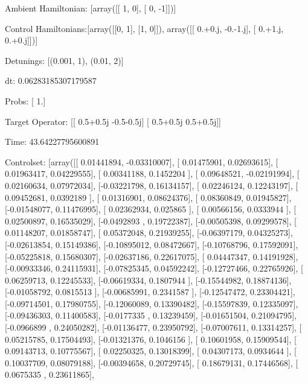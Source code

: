 \documentclass{article}
\begin{document}
    

\newpage

Ambient Hamiltonian: [array([[ 1,  0],
       [ 0, -1]])]

Control Hamiltonians:[array([[0, 1],
       [1, 0]]), array([[ 0.+0.j, -0.-1.j],
       [ 0.+1.j,  0.+0.j]])]

Detunings: [(0.001, 1), (0.01, 2)]

 dt: 0.06283185307179587

Probs: [ 1.]

Target Operator: [[ 0.5+0.5j -0.5-0.5j]
 [ 0.5+0.5j  0.5+0.5j]]

Time: 43.64227795600891

Controlset: [array([[ 0.01441894, -0.03310007],
       [ 0.01475901,  0.02693615],
       [ 0.01963417,  0.04229555],
       [ 0.00341188,  0.1452204 ],
       [ 0.09648521, -0.02191994],
       [ 0.02160634,  0.07972034],
       [-0.03221798,  0.16134157],
       [ 0.02246124,  0.12243197],
       [ 0.09452681,  0.0392189 ],
       [ 0.01316901,  0.08624376],
       [ 0.08360849,  0.01945827],
       [-0.01548077,  0.11476995],
       [ 0.02362934,  0.025865  ],
       [ 0.00566156,  0.0333944 ],
       [ 0.02500897,  0.16535029],
       [-0.0492893 ,  0.19722387],
       [-0.00505398,  0.09299578],
       [ 0.01148207,  0.01858747],
       [ 0.05372048,  0.21939255],
       [-0.06397179,  0.04325273],
       [-0.02613854,  0.15149386],
       [-0.10895012,  0.08472667],
       [-0.10768796,  0.17592091],
       [-0.05225818,  0.15680307],
       [-0.02637186,  0.22617075],
       [ 0.04447347,  0.14191928],
       [-0.00933346,  0.24115931],
       [-0.07825345,  0.04592242],
       [-0.12727466,  0.22765926],
       [ 0.06259713,  0.12245533],
       [-0.06619334,  0.1807944 ],
       [-0.15544982,  0.18874136],
       [-0.01058792,  0.0815513 ],
       [-0.00685991,  0.2341587 ],
       [-0.12547472,  0.23304421],
       [-0.09714501,  0.17980755],
       [-0.12060089,  0.13390482],
       [-0.15597839,  0.12335097],
       [-0.09436303,  0.11400583],
       [-0.0177335 ,  0.13239459],
       [-0.01651504,  0.21094795],
       [-0.0966899 ,  0.24050282],
       [-0.01136477,  0.23950792],
       [-0.07007611,  0.13314257],
       [ 0.05215785,  0.17504493],
       [-0.01321376,  0.1046156 ],
       [ 0.10601958,  0.15909544],
       [ 0.09143713,  0.10775567],
       [ 0.02250325,  0.13018399],
       [ 0.04307173,  0.0934644 ],
       [ 0.10037709,  0.08079188],
       [-0.00394658,  0.20729745],
       [ 0.18679131,  0.17446568],
       [ 0.0675335 ,  0.23611865],
\end{document}
